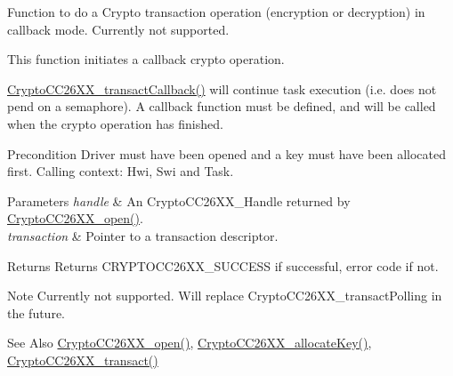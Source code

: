 Function to do a Crypto transaction operation (encryption or decryption) in callback mode. Currently not supported. 

This function initiates a callback crypto operation.

\hyperlink{_crypto_c_c26_x_x_8h_a99eb096ad8f78acf23d4e4b75616dc95}{Crypto\-C\-C26\-X\-X\-\_\-transact\-Callback()} will continue task execution (i.\-e. does not pend on a semaphore). A callback function must be defined, and will be called when the crypto operation has finished.

\begin{DoxyPrecond}{Precondition}
Driver must have been opened and a key must have been allocated first. Calling context\-: Hwi, Swi and Task.
\end{DoxyPrecond}

\begin{DoxyParams}{Parameters}
{\em handle} & An Crypto\-C\-C26\-X\-X\-\_\-\-Handle returned by \hyperlink{_crypto_c_c26_x_x_8h_a21aa1458d0b063ee3637a40487e8ee12}{Crypto\-C\-C26\-X\-X\-\_\-open()}.\\
\hline
{\em transaction} & Pointer to a transaction descriptor.\\
\hline
\end{DoxyParams}
\begin{DoxyReturn}{Returns}
Returns C\-R\-Y\-P\-T\-O\-C\-C26\-X\-X\-\_\-\-S\-U\-C\-C\-E\-S\-S if successful, error code if not.
\end{DoxyReturn}
\begin{DoxyNote}{Note}
Currently not supported. Will replace Crypto\-C\-C26\-X\-X\-\_\-transact\-Polling in the future.
\end{DoxyNote}
\begin{DoxySeeAlso}{See Also}
\hyperlink{_crypto_c_c26_x_x_8h_a21aa1458d0b063ee3637a40487e8ee12}{Crypto\-C\-C26\-X\-X\-\_\-open()}, \hyperlink{_crypto_c_c26_x_x_8h_a50d5828043e87fd37398d2aabe9b9e92}{Crypto\-C\-C26\-X\-X\-\_\-allocate\-Key()}, \hyperlink{_crypto_c_c26_x_x_8h_a6864191d34a9a3cfbcd36cc34570b3b8}{Crypto\-C\-C26\-X\-X\-\_\-transact()} 
\end{DoxySeeAlso}
